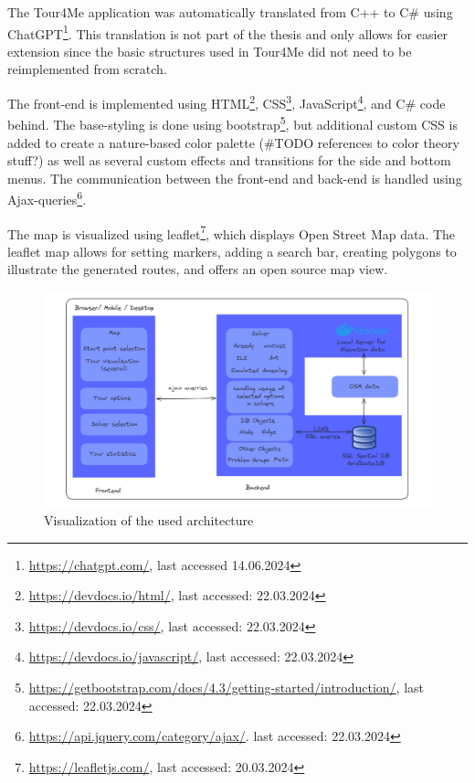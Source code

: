 The Tour4Me application was automatically translated from C++ to C\# using ChatGPT\footnote{\url{https://chatgpt.com/}, last accessed 14.06.2024}. 
This translation is not part of the thesis and only allows for easier extension since the basic structures used in Tour4Me did not need to be reimplemented from scratch.


The front-end is implemented using HTML\footnote{\url{https://devdocs.io/html/}, last accessed: 22.03.2024}, CSS\footnote{\url{https://devdocs.io/css/}, last accessed: 22.03.2024}, JavaScript\footnote{\url{https://devdocs.io/javascript/}, last accessed: 22.03.2024}, and C\# code behind. 
The base-styling is done using bootstrap\footnote{\url{https://getbootstrap.com/docs/4.3/getting-started/introduction/}, last accessed: 22.03.2024}, but additional custom CSS is added to create a nature-based color palette (\#TODO references to color theory stuff?) as well as several custom effects and transitions for the side and bottom menus.
The communication between the front-end and back-end is handled using  Ajax-queries\footnote{\url{https://api.jquery.com/category/ajax/}. last accessed: 22.03.2024}.

The map is visualized using leaflet\footnote{\url{https://leafletjs.com/}, last accessed: 20.03.2024}, which displays Open Street Map data.
The leaflet map allows for setting markers, adding a search bar, creating polygons to illustrate the generated routes, and offers an open source map view. 


\begin{figure}[ht]
	\hspace*{-25 pt}
	\includegraphics[width=1.1\textwidth]{bilder/Implementation Architecture.png}
	\caption{Visualization of the used architecture}
	\label{fig:architecture}
\end{figure}


